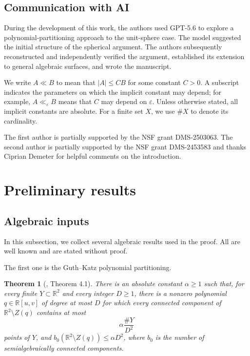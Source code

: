 \documentclass{amsart}%
\numberwithin{equation}{section}
\newtheorem{theorem}{Theorem}[section]
\newcommand{\R}{\mathbb{R}}
\newcommand{\1}{\mathbbm{1}}
\begin{document}
\bigskip

\subsection{Communication with AI}
During the development of this work, the authors used  GPT-5.6 to explore a polynomial-partitioning approach to the unit-sphere case. 
The model suggested the initial structure of the spherical argument. 
The authors subsequently reconstructed and independently verified the argument, established its extension to general algebraic surfaces, and wrote the manuscript.  


\bigskip

We write $A\ll B$ to mean that $|A|\leq C B$ for some constant $C>0$. 
A subscript indicates the parameters on which the implicit constant may depend; for example, $A\ll_{\varepsilon} B$ means that $C$ may depend on $\varepsilon$.
Unless otherwise stated, all implicit constants are absolute.
For a finite set $X$, we use $\# X$ to denote its cardinality.

\bigskip

The first author is partially supported by the NSF grant DMS-2503063.
The second author is partially supported by the NSF grant DMS-2453583 and thanks Ciprian Demeter for helpful comments on the introduction.


\bigskip


\section{Preliminary results}

\subsection{Algebraic inputs}


In this subsection, we collect several algebraic results used in the proof. 
All are well known and are stated without proof.

\medskip

The first one is the Guth--Katz polynomial partitioning.

\begin{theorem}[\cite{Guth-Katz}, Theorem 4.1]\label{thm:planar-partition}
There is an absolute constant $\alpha\ge1$ such that, for every finite $Y\subset\R^2$ and every integer $D\ge1$, there is a nonzero polynomial $q\in\R[u,v]$ of degree at most $D$ for which every connected component of $\R^2\setminus Z(q)$ contains at most
\[
 \alpha\frac{\# Y}{D^2}
\]
points of $Y$, and $b_0(\R^2\setminus Z(q))\leq \alpha D^2$, where $b_0$ is the number of semialgebraically connected components.  
\end{theorem}
\end{document}

